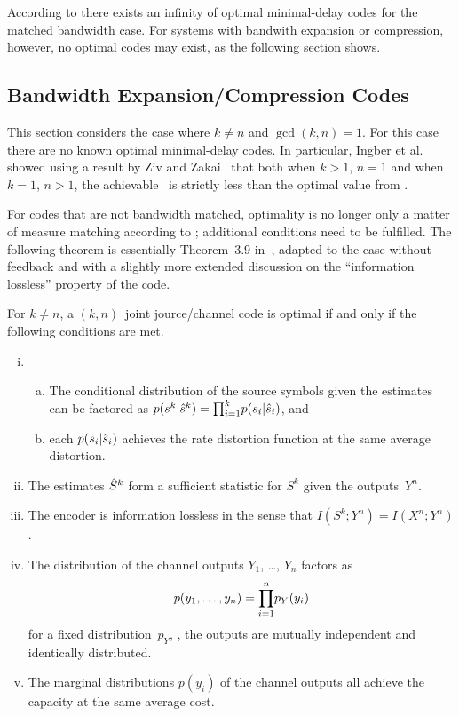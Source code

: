 According to  there exists an infinity of optimal
minimal-delay codes for the matched bandwidth case. For systems with bandwith
expansion or compression, however, no optimal codes may exist, as the following
section shows.


\subsection{Bandwidth Expansion/Compression Codes}

This section considers the case where $k \ne n$ and $\gcd(k,n) = 1$.  For this
case there are no known optimal minimal-delay codes. In particular, Ingber et
al.~\cite{IngberLZF2008} showed using a result by Ziv and Zakai~\cite{ZivZ1973}
that both when $k >1 $, $n = 1$ and when $k = 1$, $n >1$, the achievable \sdr\
is strictly less than the optimal value from . 

For codes that are not bandwidth matched, optimality is no longer only a matter
of measure matching according to \thmref{tcntcbwmatch}; additional conditions
need to be fulfilled. The following theorem is essentially Theorem~3.9
in~\cite{GastparThesis}, adapted to the case without feedback and with a
slightly more extended discussion on the ``information lossless'' property of
the code. 

\begin{theorem}
  \label{thm:tcntc1n}
  For $k \ne n$, a $(k, n)$~joint jource/channel code is optimal if and only if
  the following conditions are met.
  \begin{enumerate}[(i)]
    \item
      \begin{enumerate}[(a)]
        \item The conditional distribution of the source symbols given the
          estimates can be factored as $p(s^k|{\hat{s}}^k) = {\prod_{i=1}^k} p(s_i|{\hat{s}}_i)$, and
        \item each $p(s_i|{\hat{s}}_i)$ achieves the rate distortion function at the
          same average distortion.
      \end{enumerate}

    \item The estimates ${\hat{S}}^k$ form a sufficient statistic for $S^k$ given the
      outputs~$Y^n$.

    \item The encoder is information lossless in the sense that $I(S^k; Y^n) =
      I(X^n; Y^n)$. 

    \item The distribution of the channel outputs $Y_1$, \ldots, $Y_n$ factors
      as
      \begin{equation*}
        p(y_1, \dots, y_n) = {\prod_{i=1}^n} p_Y(y_i)
      \end{equation*}
      for a fixed distribution~$p_Y$, \ie, the outputs are mutually independent
      and identically distributed.

    \item The marginal distributions $p(y_i)$ of the channel outputs all achieve
      the capacity at the same average cost.
  \end{enumerate}
\end{theorem}

